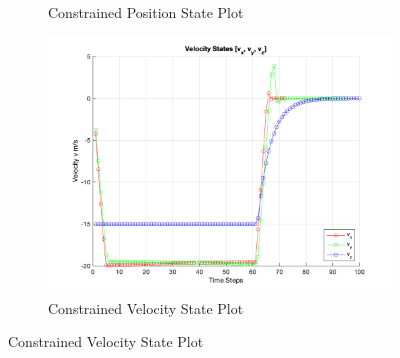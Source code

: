 \documentclass[conference, tikz]{IEEEtran}
\begin{document}
\begin{figure}[H]
\begin{subfigure}{\columnwidth}
        \caption{Constrained Position State Plot}
        \label{const:pos_state}
    \end{subfigure}
    \begin{subfigure}{\columnwidth}
        \centering
        \includegraphics[width=\columnwidth]{Figures/new/Constrained_velocity_state_plot.png}
        \caption{Constrained Velocity State Plot}
        \label{const:vel_ss}
    \end{subfigure}
\end{figure}
\end{document}
